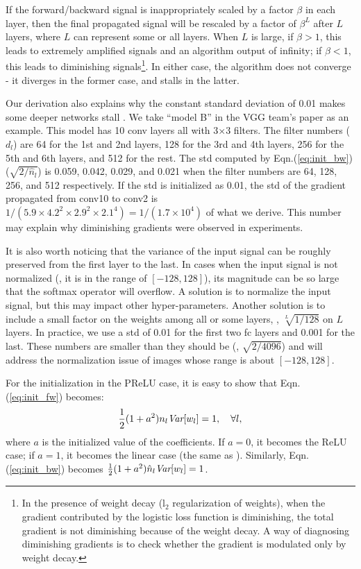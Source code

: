 \documentclass[10pt,twocolumn,letterpaper]{article}
\newcommand{\var}{\emph{Var}}
\begin{document}
If the forward/backward signal is inappropriately scaled by a factor $\beta$ in each layer, then the final propagated signal will be rescaled by a factor of $\beta^L$ after $L$ layers, where $L$ can represent some or all layers. When $L$ is large, if $\beta>1$, this leads to extremely amplified signals and an algorithm output of infinity; if $\beta<1$, this leads to diminishing signals\footnote{In the presence of weight decay (l$_2$ regularization of weights), when the gradient contributed by the logistic loss function is diminishing, the total gradient is not diminishing because of the weight decay. A way of diagnosing diminishing gradients is to check whether the gradient is modulated only by weight decay.}. In either case, the algorithm does not converge - it diverges in the former case, and stalls in the latter.

Our derivation also explains why the constant standard deviation of 0.01 makes some deeper networks stall \cite{Simonyan2014}. We take ``model B'' in the VGG team's paper \cite{Simonyan2014} as an example. This model has 10 conv layers all with 3$\times$3 filters. The filter numbers ($d_l$) are 64 for the 1st and 2nd layers, 128 for the 3rd and 4th layers, 256 for the 5th and 6th layers, and 512 for the rest.
The std computed by Eqn.(\ref{eq:init_bw}) ($\sqrt{2/{\hat{n}_l}}$) is 0.059, 0.042, 0.029, and 0.021 when the filter numbers are 64, 128, 256, and 512 respectively. If the std is initialized as 0.01, the std of the gradient propagated from conv10 to conv2 is $1/(5.9\times4.2^2\times2.9^2\times2.1^4)=1/(1.7\times10^4)$ of what we derive. This number may explain why diminishing gradients were observed in experiments.

It is also worth noticing that the variance of the input signal can be roughly preserved from the first layer to the last. In cases when the input signal is not normalized (\eg, it is in the range of $[-128, 128]$), its magnitude can be so large that the softmax operator will overflow. A solution is to normalize the input signal, but this may impact other hyper-parameters. Another solution is to include a small factor on the weights among all or some layers, \eg, $\sqrt[L]{1/128}$ on $L$ layers. In practice, we use a std of 0.01 for the first two fc layers and 0.001 for the last. These numbers are smaller than they should be (\eg, $\sqrt{2/4096}$) and will address the normalization issue of images whose range is about $[-128, 128]$.

For the initialization in the PReLU case, it is easy to show that Eqn.(\ref{eq:init_fw}) becomes:
\begin{equation}\label{eq:init_fw_prelu}
\frac{1}{2}(1+a^2)n_l\var[w_{l}]=1, \quad \forall l,
\end{equation}
where $a$ is the initialized value of the coefficients. If $a=0$, it becomes the ReLU case; if $a=1$, it becomes the linear case (the same as \cite{Glorot2010}). Similarly, Eqn.(\ref{eq:init_bw}) becomes $\frac{1}{2}(1+a^2)\hat{n}_l\var[w_{l}]=1$.
\end{document}
